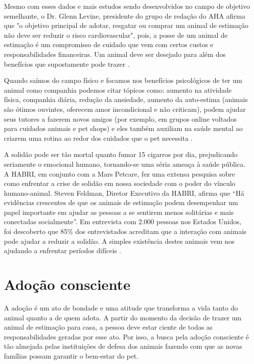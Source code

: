Mesmo com esses dados e mais estudos sendo desenvolvidos no campo de objetivo semelhante, o  Dr. Glenn Levine, presidente do grupo de redação do \ac{AHA} afirma que "o objetivo principal de adotar, resgatar ou comprar um animal de estimação não deve ser reduzir o risco cardiovascular", pois, a posse de um animal de estimação é um compromisso de cuidado que vem com certos custos e responsabilidades financeiras. Um animal deve ser desejado para além dos benefícios que supostamente pode trazer \cite{aha}.

Quando saímos do campo físico e focamos nos benefícios psicológicos de ter um animal como companhia podemos citar tópicos como: aumento na atividade física, companhia diária, redução da ansiedade, aumento da auto-estima (animais são ótimos ouvintes, oferecem amor incondicional e não criticam), podem ajudar seus tutores a fazerem novos amigos (por exemplo, em grupos online voltados para cuidados animais e pet shops) e eles também auxiliam na saúde mental ao criarem uma rotina ao redor dos cuidados que o pet necessita \cite{mental}.

A solidão pode ser tão mortal quanto fumar 15 cigarros por dia, prejudicando seriamente o emocional humano, tornando-se uma séria ameaça à saúde pública. A \ac{HABRI}, em conjunto com a Mars Petcare, fez uma extensa pesquisa sobre como enfrentar a crise de solidão em nossa sociedade com o poder do vínculo humano-animal. Steven Feldman, Diretor Executivo da \ac{HABRI}, afirma que “Há evidências crescentes de que os animais de estimação podem desempenhar um papel importante em ajudar as pessoas a se sentirem menos solitárias e mais conectadas socialmente”. Em entrevista com 2.000 pessoas nos Estados Unidos, foi descoberto que 85\% dos entrevistados acreditam que a interação com animais pode ajudar a reduzir a solidão. A simples existência destes animais vem nos ajudando a enfrentar períodos difíceis \cite{mentalpets}.

\section{Adoção consciente}
A adoção é um ato de bondade e uma atitude que transforma a vida tanto do animal quanto a de quem adota. A partir do momento da decisão de trazer um animal de estimação para casa, a pessoa deve estar ciente de todas as responsabilidades geradas por esse ato. Por isso, a busca pela adoção consciente é tão almejada pelas instituições de defesa dos animais fazendo com que as novas famílias possam garantir o bem-estar do pet. 

